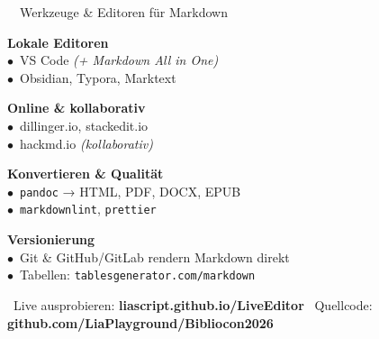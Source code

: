 \documentclass[a4paper,landscape,9pt]{extarticle}
\begin{document}
\noindent
\begin{mdinfo}{\faToolbox~~Werkzeuge \& Editoren für Markdown}
\footnotesize
\begin{minipage}[t]{0.24\linewidth}
\textbf{\color{mdblue}Lokale Editoren}\\[1pt]
$\bullet$~VS Code \textit{(+ Markdown All in One)}\\
$\bullet$~Obsidian, Typora, Marktext
\end{minipage}\hfill
\begin{minipage}[t]{0.22\linewidth}
\textbf{\color{mdblue}Online \& kollaborativ}\\[1pt]
$\bullet$~dillinger.io, stackedit.io\\
$\bullet$~hackmd.io \textit{(kollaborativ)}
\end{minipage}\hfill
\begin{minipage}[t]{0.24\linewidth}
\textbf{\color{mdblue}Konvertieren \& Qualität}\\[1pt]
$\bullet$~\texttt{pandoc} → HTML, PDF, DOCX, EPUB\\
$\bullet$~\texttt{markdownlint}, \texttt{prettier}
\end{minipage}\hfill
\begin{minipage}[t]{0.25\linewidth}
\textbf{\color{mdblue}Versionierung}\\[1pt]
$\bullet$~Git \& GitHub/GitLab rendern Markdown direkt\\
$\bullet$~Tabellen: \texttt{tablesgenerator.com/markdown}
\end{minipage}
\end{mdinfo}

\vfill
{\sffamily\scriptsize\color{muted}
\faInfoCircle~Live ausprobieren: \textbf{liascript.github.io/LiveEditor}\hfill
\faGithub~Quellcode: \textbf{github.com/LiaPlayground/Bibliocon2026}}

\newpage
\end{document}
